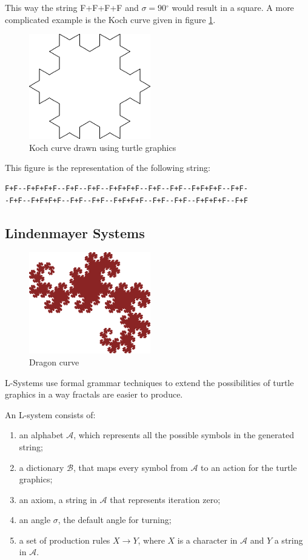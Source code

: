 \documentclass[11pt,a4paper]{article}
\newcommand{\degree}{\ensuremath{^\circ}}
\begin{document}
This way the string F+F+F+F and $\sigma = 90\degree$ would result in a square. A more complicated example is the Koch curve given in figure \ref{fig:koch}.
\begin{figure}[h!]
  \centering
  \includegraphics[]{koch.png}
  \caption{Koch curve drawn using turtle graphics}
  \label{fig:koch}
\end{figure}

This figure is the representation of the following string:
\begin{verbatim}
F+F--F+F+F+F--F+F--F+F--F+F+F+F--F+F--F+F--F+F+F+F--F+F-
-F+F--F+F+F+F--F+F--F+F--F+F+F+F--F+F--F+F--F+F+F+F--F+F
\end{verbatim}

\subsection{Lindenmayer Systems}

\begin{figure}[h!]
  \centering
  \includegraphics[]{dragon.png}
  \caption{Dragon curve}
  \label{fig:dragon}
\end{figure}

L-Systems use formal grammar techniques to extend the possibilities of turtle graphics in a way fractals are easier to produce. 

An L-system consists of:
\begin{enumerate}
\item an alphabet $\mathcal{A}$, which represents all the possible symbols in the generated string;
\item a dictionary $\mathcal{B}$, that maps every symbol from $\mathcal{A}$ to an action for the turtle graphics;
\item an axiom, a string in $\mathcal{A}$ that represents iteration zero;
\item an angle $\sigma$, the default angle for turning;
\item a set of production rules $X \rightarrow Y$, where $X$ is a character in $\mathcal{A}$ and $Y$ a string in $\mathcal{A}$.
\end{enumerate}
\label{enum:definition}
\end{document}
